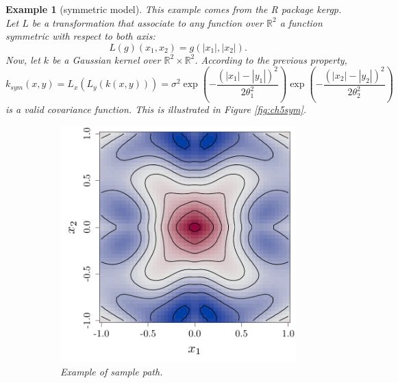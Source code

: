 \documentclass[twoside,openright]{report}
\newtheorem{example}{Example}
\begin{document}
\begin{example}[symmetric model]
    This example comes from the R package \emph{kergp}. Let $L$ be a transformation that associate to any function over $\mathds{R}^2$ a function symmetric with respect to both axis:
    \begin{equation}
       L(g)(x_1,x_2) = g(|x_1|,|x_2|).
    \end{equation}
    Now, let $k$ be a Gaussian kernel over $\mathds{R}^2 \times \mathds{R}^2$. According to the previous property, 
    \begin{equation}
       k_{sym}(x,y) = L_x(L_y(k(x,y))) = \sigma^2 \exp \left( {-\frac{(|x_1|-|y_1|)^2}{2 \theta_1^2 }} \right) \exp \left({-\frac{(|x_2|-|y_2|)^2}{2 \theta_2^2 }} \right)
    \end{equation}
    is a valid covariance function. This is illustrated in Figure \ref{fig:ch5sym}.
    \begin{figure}[ht!]
        \centering
        \begin{subfigure}[t]{0.30\textwidth}
                \includegraphics[width=\textwidth]{figures/ch5_symSample}
                \caption{Example of sample path.}
        \end{subfigure}%
        \hspace{0.2cm}       
        \begin{subfigure}[t]{0.30\textwidth}

\end{subfigure}
\end{figure}
\end{example}
\end{document}
